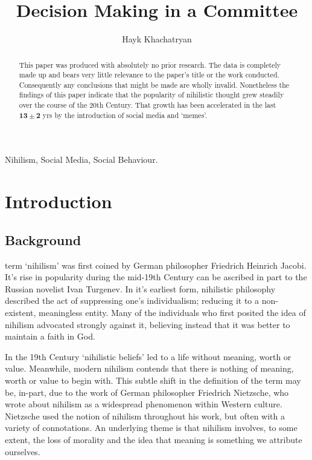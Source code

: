 \documentclass[a4paper, 10pt]{IEEEtran}
\begin{document}
\title{Decision Making in a Committee}
\author{Hayk Khachatryan}
\maketitle


\begin{abstract}
This paper was produced with absolutely no prior research. The data is completely made up and bears very little relevance to the paper's title or the work conducted. Consequently any conclusions that might be made are wholly invalid. Nonetheless the findings of this paper indicate that the popularity of nihilistic thought grew  steadily over the course of the 20th Century. That growth has been accelerated in the last $\bm{13 \pm 2}$ yrs by the introduction of social media and `memes'.
\end{abstract}

\begin{IEEEkeywords}
Nihilism, Social Media, Social Behaviour.
\end{IEEEkeywords}



\section{Introduction}
\label{sec:introduction} %

\subsection{Background}
\label{sec:background}

term `nihilism' was first coined by German philosopher Friedrich Heinrich Jacobi. It's rise in popularity during the mid-19th Century can be ascribed in part to the Russian novelist Ivan Turgenev. In it's earliest form, nihilistic philosophy described the act of suppressing one's individualism; reducing it to a non-existent, meaningless entity. Many of the individuals who first posited the idea of nihilism advocated strongly against it, believing instead that it was better to maintain a faith in God. \par

In the 19th Century `nihilistic beliefs' led to a life without meaning, worth or value. Meanwhile, modern nihilism contends that there is nothing of meaning, worth or value to begin with. This subtle shift in the definition of the term may be, in-part, due to the work of German philosopher Friedrich Nietzsche, who wrote about nihilism as a widespread phenomenon within Western culture. Nietzsche used the notion of nihilism throughout his work, but often with a variety of connotations. An underlying theme is that nihilism involves, to some extent, the loss of morality and the idea that meaning is something we attribute ourselves. \cite{WikNi}%
\par
\end{document}
